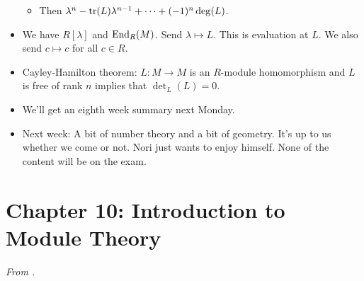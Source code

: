 \documentclass[../notes.tex]{subfiles}
\begin{document}
\begin{itemize}
\begin{itemize}
        \item Then $\lambda^n-\trace(L)\lambda^{n-1}+\cdots+(-1)^n\deg(L)$.
    \end{itemize}
    \item We have $R[\lambda]$ and $\operatorname{End}_R(M)$. Send $\lambda\mapsto L$. This is evaluation at $L$. We also send $c\mapsto c$ for all $c\in R$.
    \item Cayley-Hamilton theorem: $L:M\to M$ is an $R$-module homomorphism and $L$ is free of rank $n$ implies that $\det_L(L)=0$.
    \item We'll get an eighth week summary next Monday.
    \item Next week: A bit of number theory and a bit of geometry. It's up to us whether we come or not. Nori just wants to enjoy himself. None of the content will be on the exam.
\end{itemize}



\section{Chapter 10: Introduction to Module Theory}
\emph{From \textcite{bib:DummitFoote}.}
\setcounter{bookch}{10}
\setcounter{proposition}{7}
\end{document}
